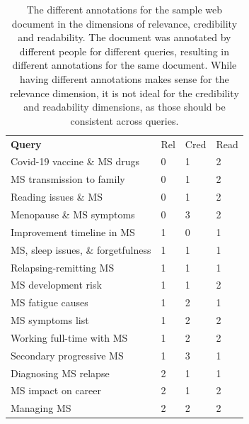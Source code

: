 \begin{table}
        \centering
        \begin{tabularx}{\linewidth}{lXXX}
        \textbf{Query}                                                         & Rel & Cred & Read \\
        Covid-19 vaccine \& MS drugs                                            & 0            & 1             & 2             \\
        MS transmission to family                                              & 0            & 1             & 2             \\
        Reading issues \& MS                                                    & 0            & 1             & 2             \\
        Menopause \& MS symptoms                                                & 0            & 3             & 2             \\
        Improvement timeline in MS                                             & 1            & 0             & 1             \\
        MS, sleep issues, \& forgetfulness                                      & 1            & 1             & 1             \\
        Relapsing-remitting MS                                                 & 1            & 1             & 1             \\
        MS development risk                                                    & 1            & 1             & 2             \\
        MS fatigue causes                                                      & 1            & 2             & 1             \\
        MS symptoms list                                                       & 1            & 2             & 2             \\
        Working full-time with MS                                              & 1            & 2             & 2             \\
        Secondary progressive MS                                               & 1            & 3             & 1             \\
        Diagnosing MS relapse                                                  & 2            & 1             & 1             \\
        MS impact on career                                                    & 2            & 1             & 2             \\
        Managing MS                                                            & 2            & 2             & 2            
        \end{tabularx}
        \caption{The different annotations for the sample web document in the dimensions of relevance, credibility and readability.
        The document was annotated by different people for different queries, resulting in different annotations for the same document.
        While having different annotations makes sense for the relevance dimension, it is not ideal for the credibility and readability dimensions, as those should be consistent across queries.}
\end{table}
